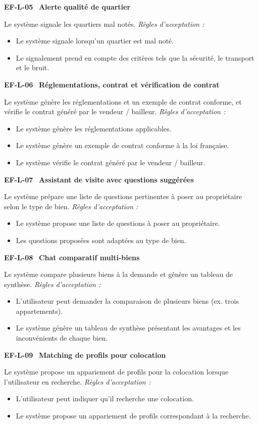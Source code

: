 \documentclass[11pt,a4paper]{article}
\newcommand{\exigence}[2]{%
  \par\vspace{6pt}%
  \noindent\colorbox{light}{%
    \parbox{\dimexpr\textwidth-2\fboxsep}{%
      \textbf{\color{primary}#1} \textemdash\ \textbf{#2}%
    }%
  }\par\vspace{2pt}%
}
\newenvironment{acceptation}
  {\vspace{2pt}\noindent\textit{Règles d'acceptation :}
   \begin{itemize}[leftmargin=1.4em,itemsep=1pt,topsep=2pt]}
  {\end{itemize}\vspace{4pt}}
\begin{document}
\exigence{EF-L-05}{Alerte qualité de quartier}
Le système signale les quartiers mal notés.
\begin{acceptation}
  \item Le système signale lorsqu'un quartier est mal noté.
  \item Le signalement prend en compte des critères tels que la sécurité, le transport et le bruit.
\end{acceptation}

\exigence{EF-L-06}{Réglementations, contrat et vérification de contrat}
Le système génère les réglementations et un exemple de contrat conforme, et
vérifie le contrat généré par le vendeur / bailleur.
\begin{acceptation}
  \item Le système génère les réglementations applicables.
  \item Le système génère un exemple de contrat conforme à la loi française.
  \item Le système vérifie le contrat généré par le vendeur / bailleur.
\end{acceptation}

\exigence{EF-L-07}{Assistant de visite avec questions suggérées}
Le système prépare une liste de questions pertinentes à poser au propriétaire
selon le type de bien.
\begin{acceptation}
  \item Le système propose une liste de questions à poser au propriétaire.
  \item Les questions proposées sont adaptées au type de bien.
\end{acceptation}

\exigence{EF-L-08}{Chat comparatif multi-biens}
Le système compare plusieurs biens à la demande et génère un tableau de
synthèse.
\begin{acceptation}
  \item L'utilisateur peut demander la comparaison de plusieurs biens (ex. trois appartements).
  \item Le système génère un tableau de synthèse présentant les avantages et les inconvénients de chaque bien.
\end{acceptation}

\exigence{EF-L-09}{Matching de profils pour colocation}
Le système propose un appariement de profils pour la colocation lorsque
l'utilisateur en recherche.
\begin{acceptation}
  \item L'utilisateur peut indiquer qu'il recherche une colocation.
  \item Le système propose un appariement de profils correspondant à la recherche.
\end{acceptation}
\end{document}
